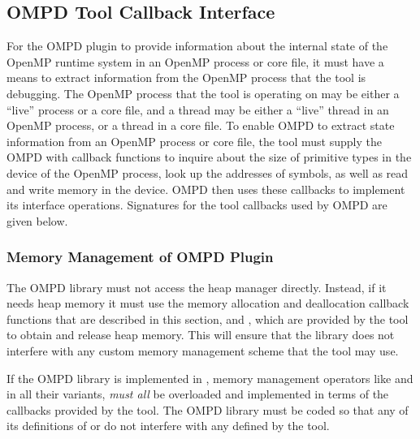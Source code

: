 \subsection{OMPD Tool Callback Interface}
\label{ompd:ompd-tool-callback-interface}

For the OMPD plugin to provide information about the internal state
of the OpenMP runtime system in an OpenMP process or core file,
it must have a means to extract information from
the OpenMP process that the tool is debugging.
The OpenMP process that the tool is operating on may be either a ``live'' process or a core file,
and a thread may be either a ``live'' thread in an OpenMP process,
or a thread in a core file.
To enable OMPD to extract state information from an OpenMP process or core file,
the tool must supply the OMPD with callback functions to inquire
about the size of primitive types in the device of the OpenMP process,
look up the addresses of symbols,
as well as read and write memory in the device.
OMPD then uses these callbacks to implement its interface operations.
Signatures for the tool callbacks used by OMPD are given below.

\subsubsection{Memory Management of OMPD Plugin}
\begin{comment}
The OMPD plugin \emph{must} obtain and release heap memory \emph{only}
using the callbacks provided to it by the tool.
It must \emph{not} call the heap manager directly using \code{malloc}.
For C++ implementations of OMPD this means that \code{new},
\code{new(throw)}, \code{new[]}, \code{delete}, \code{delete(throw)},
and \code{delete[]} in \emph{all} their variants \emph{must} be overloaded,
and implemented in terms of the callback functions
provided to it by the tool.
\end{comment}
The OMPD library must not access the heap manager directly. Instead, if it needs heap memory it 
must use the memory allocation and deallocation callback functions that are described in this 
section,  and ,  which are 
provided by the tool to obtain and release heap memory. This will ensure that the library does not 
interfere with any custom memory management scheme that the tool may use.

If the OMPD library is implemented in , memory management operators like  
and  in all their variants, \emph{must all} be overloaded and implemented in terms of 
the callbacks provided by the tool. The OMPD library must be coded so that any of its 
definitions of  or  do not interfere with any defined by the tool.

